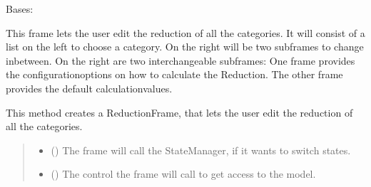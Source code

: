 \documentclass[letterpaper,10pt,english]{sphinxmanual}
\begin{document}
\begin{fulllineitems}
\label{\detokenize{apidoc/src.osm_configurator.view.toplevelframes:src.osm_configurator.view.toplevelframes.reduction_frame.ReductionFrame}}
\pysigstartsignatures
{}
\pysigstopsignatures
\sphinxAtStartPar
Bases: {\hyperref[\detokenize{apidoc/src.osm_configurator.view.toplevelframes:src.osm_configurator.view.toplevelframes.top_level_frame.TopLevelFrame}]{}}

\sphinxAtStartPar
This frame lets the user edit the reduction of all the categories.
It will consist of a list on the left to choose a category.
On the right will be two sub\sphinxhyphen{}frames to change inbetween.
On the right are two interchangeable sub\sphinxhyphen{}frames: One frame provides the configuration\sphinxhyphen{}options on how to
calculate the Reduction. The other frame provides the default calculation\sphinxhyphen{}values.

\begin{fulllineitems}
\label{\detokenize{apidoc/src.osm_configurator.view.toplevelframes:src.osm_configurator.view.toplevelframes.reduction_frame.ReductionFrame.__init__}}
\pysigstartsignatures
{}
\pysigstopsignatures
\sphinxAtStartPar
This method creates a ReductionFrame, that lets the user edit the reduction of all the categories.
\begin{quote}\begin{description}
\begin{itemize}
\item {} 
\sphinxAtStartPar
{} ({\hyperref[\detokenize{apidoc/src.osm_configurator.view.states:src.osm_configurator.view.states.state_manager.StateManager}]{}}) \textendash{} The frame will call the StateManager, if it wants to switch states.

\item {} 
\sphinxAtStartPar
{} ({\hyperref[\detokenize{apidoc/src.osm_configurator.control:src.osm_configurator.control.control_interface.IControl}]{}}) \textendash{} The control the frame will call to get access to the model.


\end{itemize}
\end{description}
\end{quote}
\end{fulllineitems}
\end{fulllineitems}
\end{document}
